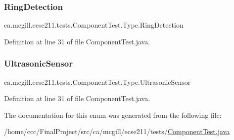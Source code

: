 \subsubsection{\texorpdfstring{Ring\+Detection}{RingDetection}}
{\footnotesize\ttfamily ca.\+mcgill.\+ecse211.\+tests.\+Component\+Test.\+Type.\+Ring\+Detection}



Definition at line 31 of file Component\+Test.\+java.

\mbox{\label{enumca_1_1mcgill_1_1ecse211_1_1tests_1_1_component_test_1_1_type_acb88d74b8bd35b190f8b1b05730c213a}} 
\subsubsection{\texorpdfstring{Ultrasonic\+Sensor}{UltrasonicSensor}}
{\footnotesize\ttfamily ca.\+mcgill.\+ecse211.\+tests.\+Component\+Test.\+Type.\+Ultrasonic\+Sensor}



Definition at line 31 of file Component\+Test.\+java.



The documentation for this enum was generated from the following file\+:\begin{DoxyCompactItemize}
\item 
/home/ccc/\+Final\+Project/src/ca/mcgill/ecse211/tests/\hyperlink{_component_test_8java}{Component\+Test.\+java}\end{DoxyCompactItemize}
